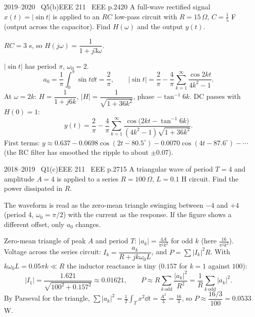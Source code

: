 \begin{qcard}{2019--2020 \textbullet\ Q5(b)}{EEE 211 \textbullet\ EEE p.24}{20}
A full-wave rectified signal $x(t)=|\sin t|$ is applied to an $RC$ low-pass circuit with $R=15\,\Omega$, $C=\frac15$ F (output across the capacitor). Find $H(\omega)$ and the output $y(t)$.
\end{qcard}
\begin{solution}
 $RC=3$ s, so $H(j\omega)=\dfrac{1}{1+j3\omega}$.

 $|\sin t|$ has period $\pi$, $\omega_0=2$.
\[a_0=\frac1\pi\int_0^\pi\sin t\dd t=\frac2\pi,\qquad |\sin t|=\frac2\pi-\frac4\pi\sum_{k=1}^\infty\frac{\cos2kt}{4k^2-1}.\]
 At $\omega=2k$: $H=\dfrac1{1+j6k}$, $|H|=\dfrac1{\sqrt{1+36k^2}}$, phase $-\tan^{-1}6k$. DC passes with $H(0)=1$:
\[y(t)=\frac2\pi-\frac4\pi\sum_{k=1}^\infty\frac{\cos\!\big(2kt-\tan^{-1}6k\big)}{(4k^2-1)\sqrt{1+36k^2}} .\]
First terms: $y\approx0.637-0.0698\cos(2t-80.5^\circ)-0.0070\cos(4t-87.6^\circ)-\cdots$ (the RC filter has smoothed the ripple to about $\pm0.07$).
\end{solution}

\begin{qcard}{2018--2019 \textbullet\ Q1(c)}{EEE 211 \textbullet\ EEE p.27}{15}
A triangular wave of period $T=4$ and amplitude $A=4$ is applied to a series $R=100\,\Omega$, $L=0.1$ H circuit. Find the power dissipated in $R$.
\end{qcard}
\begin{notebox}The waveform is read as the zero-mean triangle swinging between $-4$ and $+4$ (period 4, $\omega_0=\pi/2$) with the current as the response. If the figure shows a different offset, only $a_0$ changes.\end{notebox}
\begin{solution}
Zero-mean triangle of peak $A$ and period $T$: $|a_k|=\frac{4A}{\pi^2k^2}$ for odd $k$ (here $\frac{16}{\pi^2k^2}$). Voltage across the series circuit: $I_k=\dfrac{a_k}{R+jk\omega_0L}$, and $P=\sum|I_k|^2R$.
With $k\omega_0L=0.05\pi k\ll R$ the inductor reactance is tiny ($0.157$ for $k=1$ against $100$):
\[|I_1|=\frac{1.621}{\sqrt{100^2+0.157^2}}\approx0.01621,\qquad P\approx R\sum_{k\ \mathrm{odd}}\frac{|a_k|^2}{R^2}=\frac{1}{R}\sum_{k\ \mathrm{odd}}|a_k|^2 .\]
By Parseval for the triangle, $\sum|a_k|^2=\frac1T\int_T x^2\dd t=\frac{A^2}{3}=\frac{16}3$, so $P\approx\dfrac{16/3}{100}=0.0533$ W.
\end{solution}
